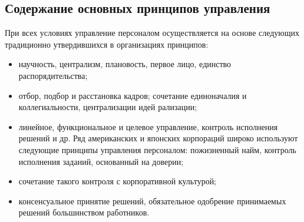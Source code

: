 \documentclass[a4paper,12pt,oneside,final]{extarticle}
\numberwithin{equation}{section}
\begin{document}
\subsection{Содержание основных принципов управления}
При всех условиях управление персоналом осуществляется на основе следующих традиционно утвердившихся в организациях принципов: 
\begin{itemize}
	\item научность, централизм, плановость, первое лицо, единство распорядительства; 
	\item отбор, подбор и расстановка кадров; сочетание единоначалия и коллегиальности, централизации идей рализации; 
	\item линейное, функциональное и целевое управление, контроль исполнения решений и др. 
	Ряд американских и японских корпораций широко используют следующие принципы управления персоналом: пожизненный найм, контроль исполнения заданий, основанный на доверии; 
	\item сочетание такого контроля с корпоративной культурой; 
	\item консенсуальное принятие решений, обязательное одобрение принимаемых решений большинством работников.
\end{itemize}
\end{document}
